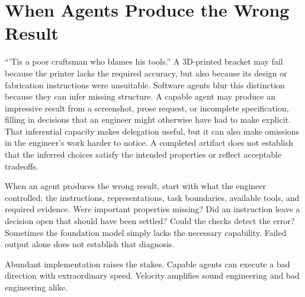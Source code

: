 \section{When Agents Produce the Wrong Result}\label{heading:whose-fault-is-it}




“’Tis a poor craftsman who blames his tools.” A 3D-printed bracket may fail because the printer lacks the required accuracy, but also because its design or fabrication instructions were unsuitable. Software agents blur this distinction because they can infer missing structure. A capable agent may produce an impressive result from a screenshot, prose request, or incomplete specification, filling in decisions that an engineer might otherwise have had to make explicit. That inferential capacity makes delegation useful, but it can also make omissions in the engineer’s work harder to notice. A completed artifact does not establish that the inferred choices satisfy the intended properties or reflect acceptable tradeoffs.


When an agent produces the wrong result, start with what the engineer controlled: the instructions, representations, task boundaries, available tools, and required evidence. Were important properties missing? Did an instruction leave a decision open that should have been settled? Could the checks detect the error? Sometimes the foundation model simply lacks the necessary capability. Failed output alone does not establish that diagnosis.



Abundant implementation raises the stakes. Capable agents can execute a bad direction with extraordinary speed. Velocity amplifies sound engineering and bad engineering alike.
